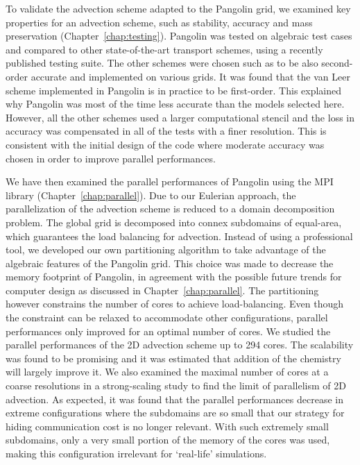 To validate the advection scheme adapted to the Pangolin grid, we examined key
properties for an advection scheme, such as stability, accuracy and mass
preservation (Chapter~\ref{chap:testing}). Pangolin was tested on algebraic test
cases and compared to other state-of-the-art transport schemes, using a recently
published testing suite. The other schemes were chosen such as to be also
second-order accurate and implemented on various grids. It was found that the
van Leer scheme implemented in Pangolin is in practice to be first-order.
This explained why Pangolin was most of the time less accurate than the models
selected here.  However, all the other schemes used a larger computational
stencil and the loss in accuracy was compensated in all of the tests with a
finer resolution. This is consistent with the initial design of the code where
moderate accuracy was chosen in order to improve parallel performances.

We have then examined the parallel performances of Pangolin using the MPI library
(Chapter~\ref{chap:parallel}). Due to our Eulerian approach, the parallelization
of the advection scheme is reduced to a domain decomposition problem. The global
grid is decomposed into connex subdomains of equal-area, which guarantees the
load balancing for advection. Instead of using a professional tool, we
developed our own partitioning algorithm to take advantage of the algebraic
features of the Pangolin grid. This choice was made to decrease the memory
footprint of Pangolin, in agreement with the possible future trends for computer
design as discussed in Chapter~\ref{chap:parallel}. The partitioning however
constrains the number of cores to achieve load-balancing. Even though the
constraint can be relaxed to accommodate other configurations, parallel
performances only improved for an optimal number of cores. We studied the
parallel performances of the 2D advection scheme up to 294 cores. The
scalability was found to be promising and it was estimated that addition of the
chemistry will largely improve it. We also examined the maximal number of cores
at a coarse resolutions in a strong-scaling study to find the limit of
parallelism of 2D advection. As expected, it was found that the parallel
performances decrease in extreme configurations where the subdomains are so
small that our strategy for hiding communication cost is no longer relevant.  With
such extremely small subdomains, only a very small portion of the memory of the
cores was used, making this configuration irrelevant for `real-life' simulations.

